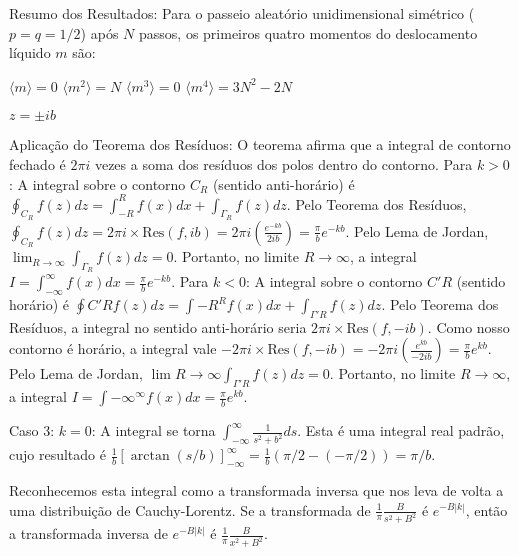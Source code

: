 \documentclass[12pt]{article}
\begin{document}
Resumo dos Resultados: Para o passeio aleatório unidimensional simétrico ($p=q=1/2$) após $N$ passos, os primeiros quatro momentos do deslocamento líquido $m$ são:

$\langle m \rangle = 0$
$\langle m^2 \rangle = N$
$\langle m^3 \rangle = 0$
$\langle m^4 \rangle = 3N^2 - 2N$

$z = \pm ib$


Aplicação do Teorema dos Resíduos: O teorema afirma que a integral de contorno fechado é $2\pi i$ vezes a soma dos resíduos dos polos dentro do contorno.
Para $k > 0$: A integral sobre o contorno $C_R$ (sentido anti-horário) é $\oint_{C_R} f(z) dz = \int_{-R}^{R} f(x) dx + \int_{\Gamma_R} f(z) dz$. Pelo Teorema dos Resíduos, $\oint_{C_R} f(z) dz = 2\pi i \times \text{Res}(f, ib) = 2\pi i \left( \frac{e^{-kb}}{2ib} \right) = \frac{\pi}{b} e^{-kb}$. Pelo Lema de Jordan, $\lim_{R \to \infty} \int_{\Gamma_R} f(z) dz = 0$. Portanto, no limite $R \to \infty$, a integral $I = \int_{-\infty}^{\infty} f(x) dx = \frac{\pi}{b} e^{-kb}$.
Para $k < 0$: A integral sobre o contorno $C'R$ (sentido horário) é $\oint{C'R} f(z) dz = \int{-R}^{R} f(x) dx + \int_{\Gamma'R} f(z) dz$. Pelo Teorema dos Resíduos, a integral no sentido anti-horário seria $2\pi i \times \text{Res}(f, -ib)$. Como nosso contorno é horário, a integral vale $-2\pi i \times \text{Res}(f, -ib) = -2\pi i \left( \frac{e^{kb}}{-2ib} \right) = \frac{\pi}{b} e^{kb}$. Pelo Lema de Jordan, $\lim{R \to \infty} \int_{\Gamma'R} f(z) dz = 0$. Portanto, no limite $R \to \infty$, a integral $I = \int{-\infty}^{\infty} f(x) dx = \frac{\pi}{b} e^{kb}$.

Caso 3: $k = 0$: A integral se torna $\int_{-\infty}^{\infty} \frac{1}{s^2+b^2} ds$. Esta é uma integral real padrão, cujo resultado é $\frac{1}{b} [\arctan(s/b)]_{-\infty}^{\infty} = \frac{1}{b} (\pi/2 - (-\pi/2)) = \pi/b$.

Reconhecemos esta integral como a transformada inversa que nos leva de volta a uma distribuição de Cauchy-Lorentz. Se a transformada de $\frac{1}{\pi} \frac{B}{s^2 + B^2}$ é $e^{-B|k|}$, então a transformada inversa de $e^{-B|k|}$ é $\frac{1}{\pi} \frac{B}{x^2 + B^2}$.
\end{document}
